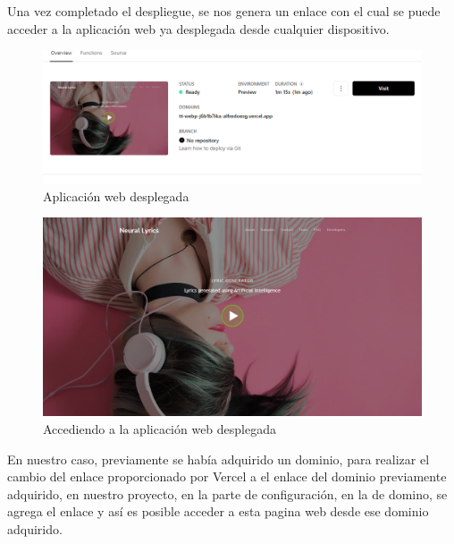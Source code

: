 \documentclass[12pt, a4paper, titlepage]{article}
\begin{document}
	Una vez completado el despliegue, se nos genera un enlace con el cual se puede acceder a la aplicación web ya desplegada desde cualquier dispositivo.
	\begin{figure}[H]
		\includegraphics[width=12cm]{./Imagenes/Despliegue/Desplegada.png}
		\centering 
		\caption{Aplicación web desplegada}
	\end{figure}
	\begin{figure}[H]
		\includegraphics[width=12cm]{./Imagenes/Despliegue/Paginaweb.png}
		\centering 
		\caption{Accediendo a la aplicación web desplegada}
	\end{figure}
	En nuestro caso, previamente se había adquirido un dominio, para realizar el cambio del enlace proporcionado por Vercel a el enlace del dominio previamente adquirido, en nuestro proyecto, en la parte de configuración, en la de domino, se agrega el enlace y así es posible acceder a esta pagina web desde ese dominio adquirido.
	\newpage
\end{document}
